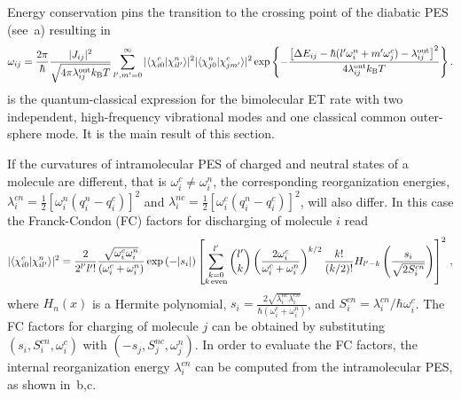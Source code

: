 Energy conservation pins the transition to the crossing point of the diabatic PES (see~a) resulting in 
\begin{eqnarray}
 \omega_{ij}= \frac{2\pi}{\hbar}  \frac{|J_{ij}|^2}{\sqrt{4\pi \lambda_{ij}^\text{out} k_\text{B}T}} 
 \sum_{l',m'=0}^\infty
 |\langle \chi_{i0}^c |\chi_{il'}^n \rangle|^2 |\langle \chi_{j0}^n |\chi_{jm'}^c \rangle|^2 
\exp
\left\{ -\frac{ \left[ \Delta E_{ij}-\hbar(l'\omega_i^n+m'\omega_j^c) -\lambda_{ij}^\text{out} \right]^2}{4\lambda_{ij}^\text{out} k_\text{B}T}
\right\} .
\label{equ:jjortner}
\end{eqnarray}
 is the quantum-classical expression for the bimolecular ET rate with two independent, high-frequency vibrational modes and one classical common outer-sphere mode. It is the main result of this section. 

If the curvatures of intramolecular PES of charged and neutral states of a molecule are different, that is $\omega_i^c\neq\omega_i^n$, the corresponding reorganization energies, $\lambda_i^{cn}=\frac{1}{2}[\omega_i^n(q_i^n-q_i^c)]^2$ and $\lambda_i^{nc}=\frac{1}{2}[\omega_i^c(q_i^n-q_i^c)]^2$, will also differ. In this case the Franck-Condon (FC) factors for discharging of molecule $i$ read \cite{chang_new_2005}
\begin{equation}
|\langle \chi_{i0}^c |\chi_{il'}^n \rangle|^2 = 
\frac{2}{2^{l'}l'!} \frac{\sqrt{\omega_i^c\omega_i^n}}{(\omega_i^c+\omega_i^n)} \exp\left( -|s_i| \right)
 \left[ \sum_{\substack{k=0\\k\,\text{even}}}^{l'} {l' \choose k} 
\left( \frac{2 \omega_i^c }{\omega_i^c+\omega_i^n}\right)^{k/2} \frac{k!}{(k/2)!}
H_{l'-k} \left( \frac{s_{i}}{\sqrt{2S^{cn}_i}}\right) 
\right]^2
\, ,
\end{equation}
where $H_n(x)$ is a Hermite polynomial, $s_i=\frac{2\sqrt{\lambda_i^{nc}\lambda_i^{cn}}}{\hbar(\omega_i^c+\omega_i^n)}$, and $S^{cn}_i=\lambda_i^{cn}/\hbar\omega_i^c$. The FC factors for charging of molecule $j$ can be obtained by substituting $(s_i,S^{cn}_i,\omega_i^c)$ with $(-s_j,S^{nc}_j, \omega_j^n)$. In order to evaluate the FC factors, the internal reorganization energy $\lambda_i^{cn}$ can be computed from the intramolecular PES, as shown in~b,c. 

